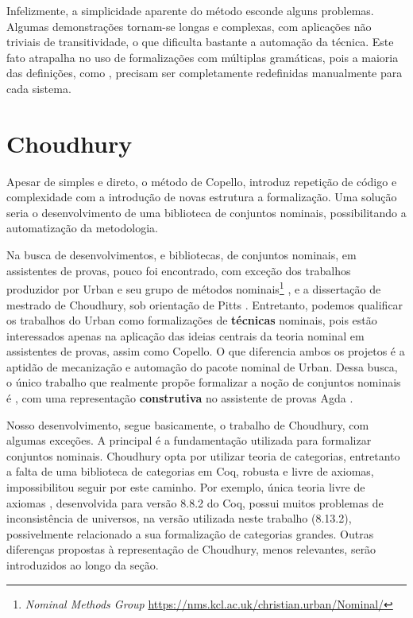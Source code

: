 Infelizmente, a simplicidade aparente do método esconde alguns problemas. Algumas demonstrações tornam-se longas e complexas, com aplicações não triviais de transitividade, o que dificulta bastante a automação da técnica. Este fato atrapalha no uso de formalizações com múltiplas gramáticas, pois a maioria das definições, como , precisam ser completamente redefinidas manualmente para cada sistema.

\section{Choudhury}\label{sec:choudhury}
Apesar de simples e direto, o método de Copello, introduz repetição de código e complexidade com a introdução de novas estrutura a formalização. Uma solução seria o desenvolvimento de uma biblioteca de conjuntos nominais, possibilitando a automatização da metodologia.

Na busca de desenvolvimentos, e bibliotecas, de conjuntos nominais, em assistentes de provas, pouco foi encontrado, com exceção dos trabalhos produzidor por Urban e seu grupo de métodos nominais\footnote{\textit{Nominal Methods Group} \url{https://nms.kcl.ac.uk/christian.urban/Nominal/}} \cite{Urban2008,Urban2005,Urban2006,Huffman2010,Urban2011}, e a dissertação de mestrado de Choudhury, sob orientação de Pitts \cite{Choudhury2015}. Entretanto,
podemos qualificar os trabalhos do Urban como formalizações de \textbf{técnicas} nominais, pois estão interessados apenas na aplicação das ideias centrais da teoria nominal em assistentes de provas, assim como Copello. O que diferencia ambos os projetos é a aptidão de mecanização e automação do pacote nominal de Urban. Dessa busca, o único trabalho que realmente propõe formalizar a noção de conjuntos nominais é \cite{Choudhury2015}, com uma representação \textbf{construtiva} no assistente de provas Agda \cite{Bove2009}. 


Nosso desenvolvimento, segue basicamente, o trabalho de Choudhury, com algumas exceções. A principal é a fundamentação utilizada para formalizar conjuntos nominais. Choudhury opta por utilizar teoria de categorias, entretanto a falta de uma biblioteca de categorias em Coq, robusta e livre de axiomas, impossibilitou seguir por este caminho. Por exemplo, única teoria livre de axiomas \cite{Wiegley}, desenvolvida para versão 8.8.2 do Coq, possui muitos problemas de inconsistência de universos, na versão utilizada neste trabalho (8.13.2), possivelmente relacionado a sua formalização de categorias grandes. Outras diferenças propostas à representação de Choudhury, menos relevantes, serão introduzidos ao longo da seção.

